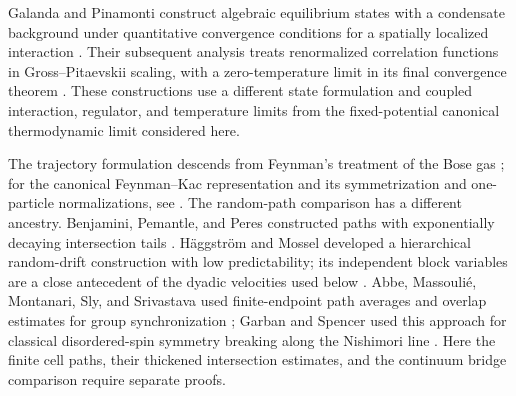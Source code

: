 Galanda and Pinamonti construct algebraic equilibrium states with a
condensate background under quantitative convergence conditions for a
spatially localized interaction \cite[Theorem~6.8]{GalandaPinamonti2025Equilibrium}.
Their subsequent analysis treats renormalized correlation functions in
Gross--Pitaevskii scaling, with a zero-temperature limit in its final
convergence theorem \cite[Theorem~7.3]{GalandaPinamonti2026GP}.
These constructions use a different state formulation and coupled
interaction, regulator, and temperature limits from the fixed-potential
canonical thermodynamic limit considered here.

The trajectory formulation descends from Feynman's treatment of the
Bose gas \cite{Feynman1953AtomicLambda}; for the canonical
Feynman--Kac representation and its symmetrization and one-particle
normalizations, see \cite[Appendix~A]{Ueltschi2006FeynmanCycles}.
The random-path comparison has a different ancestry.
Benjamini, Pemantle, and Peres constructed paths with exponentially
decaying intersection tails \cite{BenjaminiPemantlePeres1998}.
H\"aggstr\"om and Mossel developed a hierarchical random-drift
construction with low predictability; its independent block variables
are a close antecedent of the dyadic velocities used below
\cite[Section~3, Proposition~3.1]{HaggstromMossel1998}.
Abbe, Massouli\'e, Montanari, Sly, and Srivastava used finite-endpoint
path averages and overlap estimates for group synchronization
\cite{AbbeMassoulieMontanariSlySrivastava2018}; Garban and Spencer used
this approach for classical disordered-spin symmetry breaking along the Nishimori line
\cite{GarbanSpencer2023}. Here the finite cell paths, their thickened
intersection estimates, and the continuum bridge comparison require
separate proofs.
